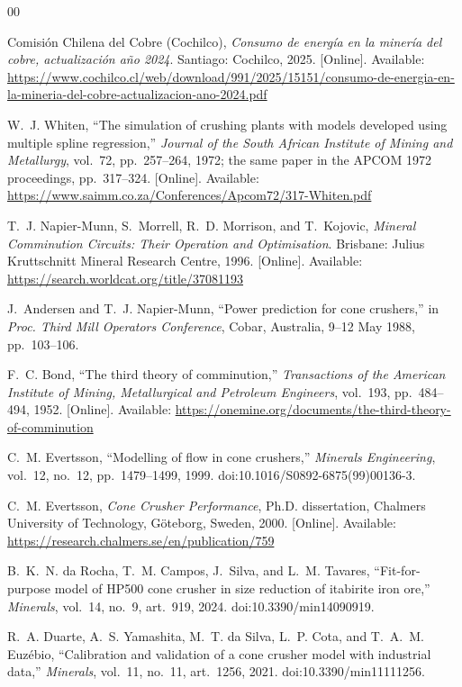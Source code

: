 \documentclass[journal]{IEEEtran}
\begin{document}
\begin{thebibliography}{00}

 Comisi\'on Chilena del Cobre (Cochilco), \emph{Consumo de energ\'ia en la miner\'ia del cobre,
actualizaci\'on a\~no 2024}. Santiago: Cochilco, 2025. [Online]. Available:
\url{https://www.cochilco.cl/web/download/991/2025/15151/consumo-de-energia-en-la-mineria-del-cobre-actualizacion-ano-2024.pdf}

 W.~J. Whiten, ``The simulation of crushing plants with models developed using multiple spline
regression,'' \emph{Journal of the South African Institute of Mining and Metallurgy}, vol.~72, pp.~257--264, 1972; the
same paper in the APCOM 1972 proceedings, pp.~317--324. [Online]. Available: \url{https://www.saimm.co.za/Conferences/Apcom72/317-Whiten.pdf}

 T.~J. Napier-Munn, S.~Morrell, R.~D. Morrison, and T.~Kojovic, \emph{Mineral Comminution
Circuits: Their Operation and Optimisation}. Brisbane: Julius Kruttschnitt Mineral Research Centre, 1996. [Online].
Available: \url{https://search.worldcat.org/title/37081193}

 J.~Andersen and T.~J. Napier-Munn, ``Power prediction for cone crushers,'' in \emph{Proc. Third Mill
Operators Conference}, Cobar, Australia, 9--12 May 1988, pp.~103--106.

 F.~C. Bond, ``The third theory of comminution,'' \emph{Transactions of the American Institute of
Mining, Metallurgical and Petroleum Engineers}, vol.~193, pp.~484--494, 1952. [Online]. Available:
\url{https://onemine.org/documents/the-third-theory-of-comminution}

 C.~M. Evertsson, ``Modelling of flow in cone crushers,'' \emph{Minerals Engineering}, vol.~12,
no.~12, pp.~1479--1499, 1999. doi:10.1016/S0892-6875(99)00136-3.

 C.~M. Evertsson, \emph{Cone Crusher Performance}, Ph.D. dissertation, Chalmers University of
Technology, G\"oteborg, Sweden, 2000. [Online]. Available: \url{https://research.chalmers.se/en/publication/759}

 B.~K.~N. da Rocha, T.~M. Campos, J.~Silva, and L.~M. Tavares, ``Fit-for-purpose model of HP500 cone
crusher in size reduction of itabirite iron ore,'' \emph{Minerals}, vol.~14, no.~9, art.~919, 2024.
doi:10.3390/min14090919.

 R.~A. Duarte, A.~S. Yamashita, M.~T. da Silva, L.~P. Cota, and T.~A.~M. Euz\'ebio, ``Calibration and
validation of a cone crusher model with industrial data,'' \emph{Minerals}, vol.~11, no.~11, art.~1256, 2021.
doi:10.3390/min11111256.


\end{thebibliography}
\end{document}
